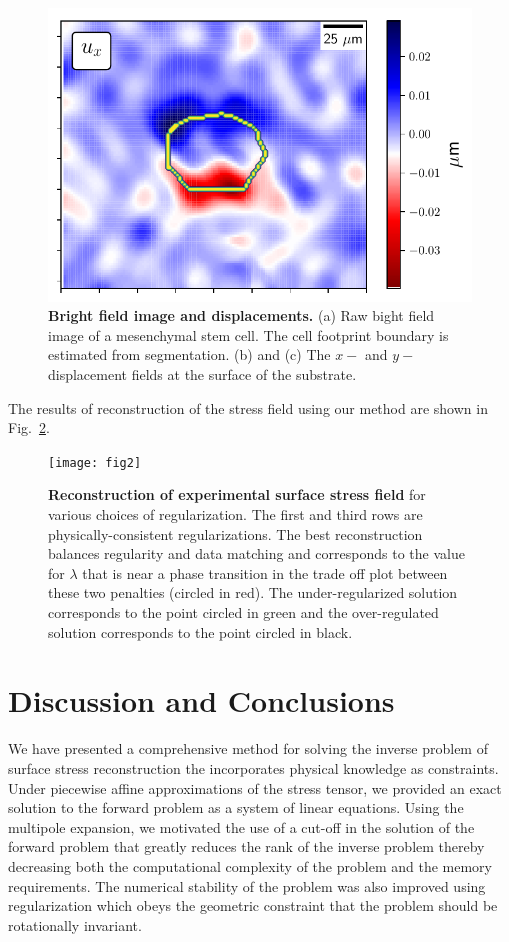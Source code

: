 \documentclass[aps,prl,reprint,twocolumn,groupedaddress,showpacs]{revtex4-1}
\begin{document}
\begin{figure}
\includegraphics[width=\linewidth]{fig0a}
\caption{\textbf{Bright field image and displacements.} (a) Raw bight
  field image of a mesenchymal stem cell. The cell footprint boundary
  is estimated from segmentation. (b) and (c) The $x-$ and
  $y-$displacement fields at the surface of the substrate.}
\label{DATA}
\end{figure}
%
The results of reconstruction of the stress field using our method are
shown in Fig.~\ref{fig:fig2}.

\begin{figure}
\texttt{[image: fig2]}
\caption{\textbf{Reconstruction of experimental surface stress field} for various
  choices of regularization. The first and third rows are
  physically-consistent regularizations. The best reconstruction
  balances regularity and data matching and corresponds to the value
  for $\lambda$ that is near a phase transition in the trade off plot
  between these two penalties (circled in red). The under-regularized
  solution corresponds to the point circled in green and the
  over-regulated solution corresponds to the point circled in black.}
\label{fig:fig2}
\end{figure}

\section{Discussion and Conclusions}

We have presented a comprehensive method for solving the inverse
problem of surface stress reconstruction the incorporates physical
knowledge as constraints.  Under piecewise affine approximations of
the stress tensor, we provided an exact solution to the forward
problem as a system of linear equations. Using the multipole
expansion, we motivated the use of a cut-off in the solution of the
forward problem that greatly reduces the rank of the inverse problem
thereby decreasing both the computational complexity of the problem
and the memory requirements. The numerical stability of the problem
was also improved using regularization which obeys the geometric 
constraint that the problem should be rotationally invariant.
\end{document}
